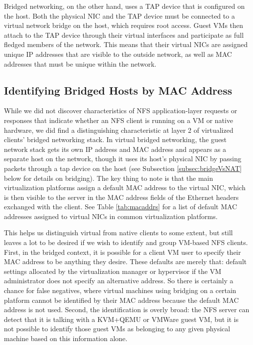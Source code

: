 \documentclass[11pt,pdftex,twocolumn]{article}
\begin{document}
Bridged networking, on the other hand, uses a TAP device that is configured on the host. Both the physical NIC and the TAP device must be connected to a virtual network bridge on the host, which requires root access. Guest VMs then attach to the TAP device through their virtual interfaces and participate as full fledged members of the network. This means that their virtual NICs are assigned unique IP addresses that are visible to the outside network, as well as MAC addresses that must be unique within the network.


\subsection{Identifying Bridged Hosts by MAC Address}
\label{subsec:macaddrs}
While we did not discover characteristics of NFS application-layer requests or responses that indicate whether an NFS client is running on a VM or native hardware, we did find a distinguishing characteristic at layer 2 of virtualized clients' bridged networking stack. In virtual bridged networking, the guest network stack gets its own IP address and MAC address and appears as a separate host on the network, though it uses its host's physical NIC by passing packets through a tap device on the host (see Subsection \ref{subsec:bridgeVsNAT} below for details on bridging). The key thing to note is that the main virtualization platforms assign a default MAC address to the virtual NIC, which is then visible to the server in the MAC address fields of the Ethernet headers exchanged with the client. See Table \ref{tab:macaddrs} for a list of default MAC addresses assigned to virtual NICs in common virtualization platforms. 

This helps us distinguish virtual from native clients to some extent, but still leaves a lot to be desired if we wish to identify and group VM-based NFS clients. First, in the bridged context, it is possible for a client VM user to specify their MAC address to be anything they desire. These defaults are merely that: default settings allocated by the virtualization manager or hypervisor if the VM administrator does not specify an alternative address. So there is certainly a chance for false negatives, where virtual machines using bridging on a certain platform cannot be identified by their MAC address because the default MAC address is not used. Second, the identification is overly broad: the NFS server can detect that it is talking with a KVM+QEMU or VMWare guest VM, but it is not possible to identify those guest VMs as belonging to any given physical machine based on this information alone. 
\end{document}
